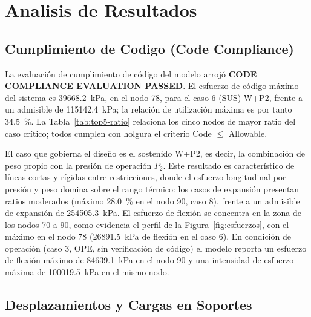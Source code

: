 \section{Analisis de Resultados}
\label{sec:analisis}

\subsection{Cumplimiento de Codigo (Code Compliance)}

La evaluaci\'{o}n de cumplimiento de c\'{o}digo del modelo arroj\'{o}
\textbf{CODE COMPLIANCE EVALUATION PASSED}. El esfuerzo de c\'{o}digo
m\'{a}ximo del sistema es \num{39668.2}~\si{kPa}, en el nodo 78, para el caso
6 (SUS) W+P2, frente a un admisible de \num{115142.4}~\si{kPa}; la
relaci\'{o}n de utilizaci\'{o}n m\'{a}xima es por tanto 34.5~\%. La
Tabla~\ref{tab:top5-ratio} relaciona los cinco nodos de mayor ratio del caso
cr\'{i}tico; todos cumplen con holgura el criterio Code $\leq$ Allowable.



El caso que gobierna el dise\~{n}o es el sostenido W+P2, es decir, la
combinaci\'{o}n de peso propio con la presi\'{o}n de operaci\'{o}n $P_2$. Este
resultado es caracter\'{i}stico de l\'{i}neas cortas y r\'{i}gidas entre
restricciones, donde el esfuerzo longitudinal por presi\'{o}n y peso domina
sobre el rango t\'{e}rmico: los casos de expansi\'{o}n presentan ratios
moderados (m\'{a}ximo 28.0~\% en el nodo 90, caso 8), frente a un admisible de
expansi\'{o}n de \num{254505.3}~\si{kPa}. El esfuerzo de flexi\'{o}n se
concentra en la zona de los nodos 70 a 90, como evidencia el perfil de la
Figura~\ref{fig:esfuerzos}, con el m\'{a}ximo en el nodo 78
(\num{26891.5}~\si{kPa} de flexi\'{o}n en el caso 6). En condici\'{o}n de
operaci\'{o}n (caso 3, OPE, sin verificaci\'{o}n de c\'{o}digo) el modelo
reporta un esfuerzo de flexi\'{o}n m\'{a}ximo de \num{84639.1}~\si{kPa} en el
nodo 90 y una intensidad de esfuerzo m\'{a}xima de \num{100019.5}~\si{kPa} en
el mismo nodo.

\subsection{Desplazamientos y Cargas en Soportes}

